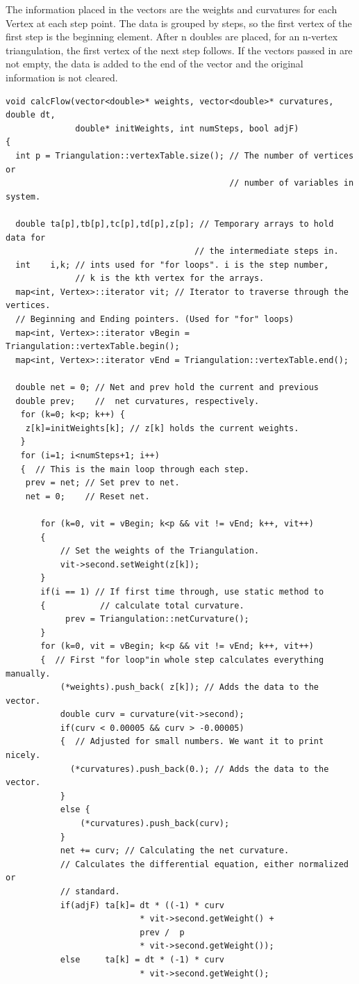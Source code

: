 \documentclass[12pt]{article}
\begin{document}
 The information placed in the vectors are the weights and curvatures for each Vertex at each step point. The data is grouped by steps, so the first vertex of the first step is the beginning element. After n doubles are placed, for an n-vertex triangulation, the first vertex of the next step follows. If the vectors passed in are not empty, the data is added to the end of the vector and the original information is not cleared.

\label{calcFlowCode}
\begin{verbatim}
void calcFlow(vector<double>* weights, vector<double>* curvatures, double dt, 
              double* initWeights, int numSteps, bool adjF)  
{
  int p = Triangulation::vertexTable.size(); // The number of vertices or 
                                             // number of variables in system.
                                         
  double ta[p],tb[p],tc[p],td[p],z[p]; // Temporary arrays to hold data for 
                                      // the intermediate steps in.
  int    i,k; // ints used for "for loops". i is the step number,
              // k is the kth vertex for the arrays.
  map<int, Vertex>::iterator vit; // Iterator to traverse through the vertices.
  // Beginning and Ending pointers. (Used for "for" loops)
  map<int, Vertex>::iterator vBegin = Triangulation::vertexTable.begin();
  map<int, Vertex>::iterator vEnd = Triangulation::vertexTable.end();
  
  double net = 0; // Net and prev hold the current and previous
  double prev;    //  net curvatures, respectively.
   for (k=0; k<p; k++) {
    z[k]=initWeights[k]; // z[k] holds the current weights.
   }
   for (i=1; i<numSteps+1; i++)
   {  // This is the main loop through each step.
    prev = net; // Set prev to net.
    net = 0;    // Reset net.
    
       for (k=0, vit = vBegin; k<p && vit != vEnd; k++, vit++)  
       {
           // Set the weights of the Triangulation.
           vit->second.setWeight(z[k]);
       }
       if(i == 1) // If first time through, use static method to 
       {           // calculate total curvature.
            prev = Triangulation::netCurvature();
       }
       for (k=0, vit = vBegin; k<p && vit != vEnd; k++, vit++) 
       {  // First "for loop"in whole step calculates everything manually.
           (*weights).push_back( z[k]); // Adds the data to the vector.
           double curv = curvature(vit->second);
           if(curv < 0.00005 && curv > -0.00005) 
           {  // Adjusted for small numbers. We want it to print nicely.
             (*curvatures).push_back(0.); // Adds the data to the vector.
           }
           else {
               (*curvatures).push_back(curv);
           }
           net += curv; // Calculating the net curvature.
           // Calculates the differential equation, either normalized or
           // standard.
           if(adjF) ta[k]= dt * ((-1) * curv 
                           * vit->second.getWeight() +
                           prev /  p
                           * vit->second.getWeight());
           else     ta[k] = dt * (-1) * curv 
                           * vit->second.getWeight();
           

\end{verbatim}
\end{document}
